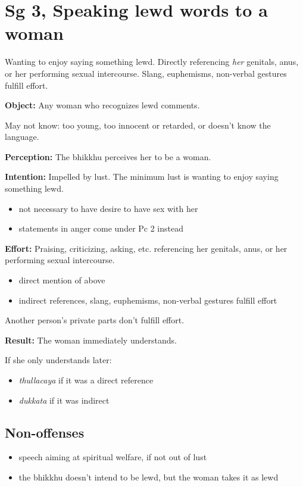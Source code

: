 \section{Sg 3, Speaking lewd words to a woman}

\begin{multicols}{2}

Wanting to enjoy saying something lewd. Directly referencing \emph{her}
genitals, anus, or her performing sexual intercourse. Slang, euphemisms,
non-verbal gestures fulfill effort.

\textbf{Object:} Any woman who recognizes lewd comments.

May not know: too young, too innocent or retarded, or doesn't know the
language.

\textbf{Perception:} The bhikkhu perceives her to be a woman.

\textbf{Intention:} Impelled by lust. The minimum lust is wanting to
enjoy saying something lewd.

\begin{itemize}
\tightlist
\item
  not necessary to have desire to have sex with her
\item
  statements in anger come under Pc 2 instead
\end{itemize}

\textbf{Effort:} Praising, criticizing, asking, etc. referencing her
genitals, anus, or her performing sexual intercourse.

\begin{itemize}
\tightlist
\item
  direct mention of above
\item
  indirect references, slang, euphemisms, non-verbal gestures fulfill
  effort
\end{itemize}

Another person's private parts don't fulfill effort.

\textbf{Result:} The woman immediately understands.

If she only understands later:

\begin{itemize}
\tightlist
\item
  \emph{thullacaya} if it was a direct reference
\item
  \emph{dukkata} if it was indirect
\end{itemize}

\subsection{Non-offenses}

\begin{itemize}
\tightlist
\item
  speech aiming at spiritual welfare, if not out of lust
\item
  the bhikkhu doesn't intend to be lewd, but the woman takes it as lewd
\end{itemize}

\end{multicols}

